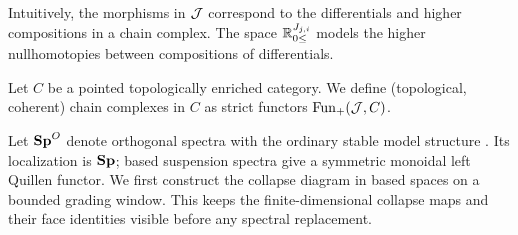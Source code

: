 \begin{rem}
Intuitively, the morphisms in $\mathcal{J}$ correspond to the differentials and higher compositions in a chain complex. The space $\mathbb{R}_{0 \leq}^{J_{j,i}}$ models the higher nullhomotopies between compositions of differentials.
\end{rem}

\begin{defn}
    Let $C$ be a pointed topologically enriched category.
    We define (topological, coherent) chain complexes in $C$ as strict functors $\operatorname{Fun}_+(\mathcal{J},C)$.
\end{defn}

Let $\mathbf{Sp}^O$ denote orthogonal spectra with the ordinary stable model structure \cite{MMSS01}. Its localization is $\mathbf{Sp}$; based suspension spectra give a symmetric monoidal left Quillen functor. We first construct the collapse diagram in based spaces on a bounded grading window. This keeps the finite-dimensional collapse maps and their face identities visible before any spectral replacement.

